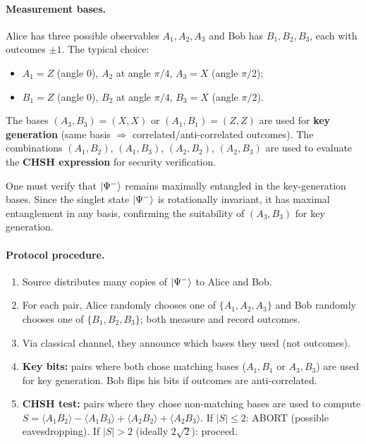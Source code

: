 \documentclass[10pt,a4paper]{article}
\begin{document}
\paragraph{Measurement bases.} Alice has three possible observables $A_1,A_2,A_3$ and Bob has $B_1,B_2,B_3$, each with outcomes $\pm 1$. The typical choice:
\begin{itemize}[nosep]
\item $A_1=Z$ (angle $0$), $A_2$ at angle $\pi/4$, $A_3=X$ (angle $\pi/2$);
\item $B_1=Z$ (angle $0$), $B_2$ at angle $\pi/4$, $B_3=X$ (angle $\pi/2$).
\end{itemize}
The bases $(A_3,B_3)=(X,X)$ or $(A_1,B_1)=(Z,Z)$ are used for \textbf{key generation} (same basis $\Rightarrow$ correlated/anti-correlated outcomes). The combinations $(A_1,B_2)$, $(A_1,B_3)$, $(A_2,B_2)$, $(A_2,B_3)$ are used to evaluate the \textbf{CHSH expression} for security verification.

One must verify that $\ket{\Psi^-}$ remains maximally entangled in the key-generation bases. Since the singlet state $\ket{\Psi^-}$ is rotationally invariant, it has maximal entanglement in any basis, confirming the suitability of $(A_3,B_3)$ for key generation.

\paragraph{Protocol procedure.}
\begin{enumerate}[nosep]
\item Source distributes many copies of $\ket{\Psi^-}$ to Alice and Bob.
\item For each pair, Alice randomly chooses one of $\{A_1,A_2,A_3\}$ and Bob randomly chooses one of $\{B_1,B_2,B_3\}$; both measure and record outcomes.
\item Via classical channel, they announce which bases they used (not outcomes).
\item \textbf{Key bits:} pairs where both chose matching bases ($A_1,B_1$ or $A_3,B_3$) are used for key generation. Bob flips his bits if outcomes are anti-correlated.
\item \textbf{CHSH test:} pairs where they chose non-matching bases are used to compute $S=\langle A_1B_2\rangle-\langle A_1B_3\rangle+\langle A_2B_2\rangle+\langle A_2B_3\rangle$. If $|S|\le 2$: ABORT (possible eavesdropping). If $|S|>2$ (ideally $2\sqrt{2}$): proceed.
\end{enumerate}
\end{document}
